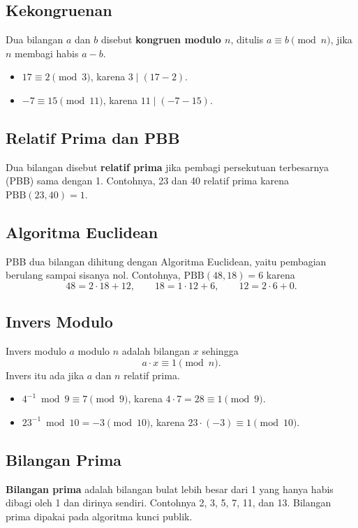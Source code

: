 \subsection{Kekongruenan}
\label{sec:kekongruenan}

Dua bilangan $a$ dan $b$ disebut \textbf{kongruen modulo $n$}, ditulis
$a \equiv b \pmod n$, jika $n$ membagi habis $a - b$.
\begin{itemize}
    \item $17 \equiv 2 \pmod 3$, karena $3 \mid (17 - 2)$.
    \item $-7 \equiv 15 \pmod{11}$, karena $11 \mid (-7 - 15)$.
\end{itemize}

\subsection{Relatif Prima dan PBB}

Dua bilangan disebut \textbf{relatif prima} jika pembagi persekutuan terbesarnya
(PBB) sama dengan 1. Contohnya, 23 dan 40 relatif prima karena
$\text{PBB}(23,40) = 1$.

\subsection{Algoritma Euclidean}

PBB dua bilangan dihitung dengan Algoritma Euclidean, yaitu pembagian berulang
sampai sisanya nol. Contohnya, $\text{PBB}(48,18) = 6$ karena
\[
    48 = 2 \cdot 18 + 12, \qquad
    18 = 1 \cdot 12 + 6, \qquad
    12 = 2 \cdot 6 + 0.
\]

\subsection{Invers Modulo}

Invers modulo $a$ modulo $n$ adalah bilangan $x$ sehingga
\[
    a \cdot x \equiv 1 \pmod n .
\]
Invers itu ada jika $a$ dan $n$ relatif prima.
\begin{itemize}
    \item $4^{-1} \bmod 9 \equiv 7 \pmod 9$, karena $4 \cdot 7 = 28 \equiv 1 \pmod 9$.
    \item $23^{-1} \bmod 10 = -3 \pmod{10}$, karena $23 \cdot (-3) \equiv 1 \pmod{10}$.
\end{itemize}

\subsection{Bilangan Prima}

\textbf{Bilangan prima} adalah bilangan bulat lebih besar dari 1 yang hanya habis
dibagi oleh 1 dan dirinya sendiri. Contohnya 2, 3, 5, 7, 11, dan 13. Bilangan
prima dipakai pada algoritma kunci publik.
